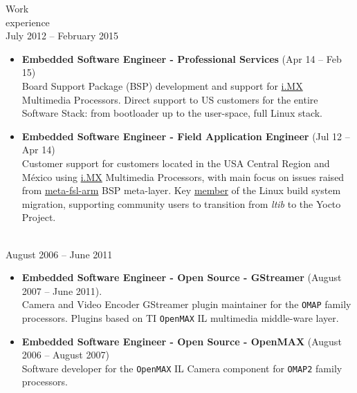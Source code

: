 \documentclass{resume}
\def\fsl{Freescale Semiconductor}
\def\texasins{Texas Instruments}
\def\dextra{Dextra Technologies}
\begin{document}
\begin{category}{Work \\experience}
  \citem{\fsl}\\
  July 2012 -- February 2015

  \begin{itemize}
  \item \textbf{Embedded Software Engineer - Professional Services} (Apr 14 -- Feb 15)\\
    Board Support Package (BSP) development and support for
    \href{https://www.nxp.com/products/processors-and-microcontrollers/arm-processors/i-mx-applications-processors:IMX_HOME}{i.MX}
    Multimedia Processors. Direct support to US customers for the entire Software Stack: from bootloader up to the user-space, full Linux
    stack.
  \end{itemize}

  \begin{itemize}
  \item \textbf{Embedded Software Engineer - Field Application Engineer} (Jul 12 -- Apr 14)\\
    Customer support for customers located in the USA Central Region and M\'exico using
    \href{https://www.nxp.com/products/processors-and-microcontrollers/arm-processors/i-mx-applications-processors:IMX_HOME}{i.MX}
    Multimedia Processors, with main focus on issues raised from \href{https://git.yoctoproject.org/cgit/cgit.cgi/meta-fsl-arm}{meta-fsl-arm} BSP meta-layer.
    Key \href{https://community.nxp.com/t5/user/viewprofilepage/user-id/25586}{member}
    of the Linux build system migration, supporting community users to transition from \textit{ltib} to the Yocto Project.
  \end{itemize}

  \citem{\dextra - \texasins}\\
  August 2006 -- June 2011

  \begin{itemize}
  \item \textbf{Embedded Software Engineer - Open Source - GStreamer} (August 2007 -- June 2011).\\
    Camera and Video Encoder GStreamer plugin maintainer for the \texttt{OMAP} family
    processors. Plugins based on TI \texttt{OpenMAX} IL multimedia middle-ware layer.
  \end{itemize}

  \begin{itemize}
  \item \textbf{Embedded Software Engineer - Open Source - OpenMAX} (August 2006 -- August 2007)\\
    Software developer for the \texttt{OpenMAX} IL Camera component for
    \texttt{OMAP2} family processors.
  \end{itemize}
  
\end{category}
\end{document}
